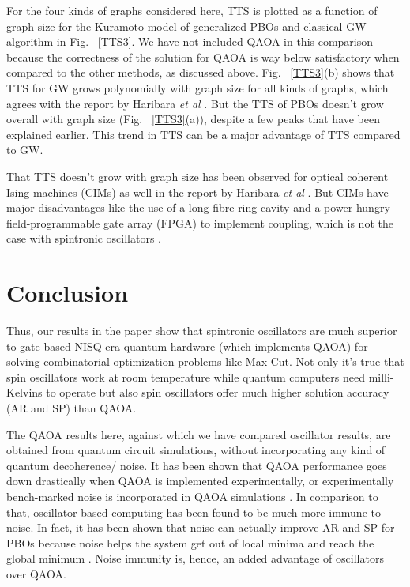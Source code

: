 \documentclass[10pt]{article}
\begin{document}
For the four kinds of graphs considered here, TTS is plotted as a function of graph size for the Kuramoto model of generalized PBOs and classical GW algorithm in Fig. ~\ref{TTS3}. We have not included QAOA in this comparison because the correctness of the solution for QAOA is way below satisfactory when compared to the other methods, as discussed above. Fig. ~\ref{TTS3}(b) shows that TTS for GW grows polynomially with graph size for all kinds of graphs, which agrees with the report by Haribara \textit{et al} \cite{GWvsSAvsCIM}. But the TTS of PBOs doesn't grow overall with graph size (Fig. ~\ref{TTS3}(a)), despite a few peaks that have been explained earlier. This trend in TTS can be a major advantage of TTS compared to GW.

That TTS doesn't grow with graph size has been observed for optical coherent Ising machines (CIMs) as well in the report by Haribara \textit{et al} \cite{GWvsSAvsCIM}. But CIMs have major disadvantages like the use of a long fibre ring cavity and a power-hungry field-programmable gate array (FPGA) to implement coupling, which is not the case with spintronic oscillators \cite{MIT2}.




\section{Conclusion}

Thus, our results in the paper show that spintronic oscillators are much superior to gate-based NISQ-era quantum hardware (which implements QAOA) \cite{NISQReview} for solving combinatorial optimization problems like Max-Cut. Not only it's true that spin oscillators work at room temperature while quantum computers need milli-Kelvins to operate \cite{NISQReview}  but also spin oscillators offer much higher solution accuracy (AR and SP) than QAOA. 



The QAOA results here, against which we have compared oscillator results, are obtained from quantum circuit simulations, without incorporating any kind of quantum decoherence/ noise. It has been shown that QAOA performance goes down drastically when QAOA is implemented experimentally, or experimentally bench-marked noise is incorporated in QAOA simulations \cite{QAOA_Noise,QAOA_ICQCE1,QAOA_ICQCE2}. In comparison to that, oscillator-based computing has been found to be much more immune to noise. In fact, it has been shown that noise can actually improve AR and SP for PBOs because noise helps the system get out of local minima and reach the global minimum \cite{Jaijeet1,Jaijeet2,Csaba_Noise}. Noise immunity is, hence, an added advantage of oscillators over QAOA.
\end{document}
